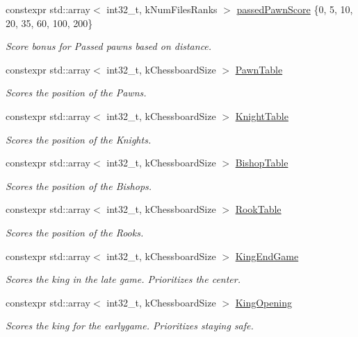 \begin{DoxyCompactItemize}
\mbox{\label{namespaceValue_aa30303e1cad8afe4b7ef7cf689ab2352}} 
constexpr std\+::array$<$ int32\+\_\+t, k\+Num\+Files\+Ranks $>$ \mbox{\hyperlink{namespaceValue_aa30303e1cad8afe4b7ef7cf689ab2352}{passed\+Pawn\+Score}} \{0, 5, 10, 20, 35, 60, 100, 200\}
\begin{DoxyCompactList}\small\item\em Score bonus for Passed pawns based on distance. \end{DoxyCompactList}\item 
constexpr std\+::array$<$ int32\+\_\+t, k\+Chessboard\+Size $>$ \mbox{\hyperlink{namespaceValue_a8b6c72010096d1ae9eb653c5be418db0}{Pawn\+Table}}
\begin{DoxyCompactList}\small\item\em Scores the position of the Pawns. \end{DoxyCompactList}\item 
constexpr std\+::array$<$ int32\+\_\+t, k\+Chessboard\+Size $>$ \mbox{\hyperlink{namespaceValue_a4b65a409f1e288260d4e71d6c13376b5}{Knight\+Table}}
\begin{DoxyCompactList}\small\item\em Scores the position of the Knights. \end{DoxyCompactList}\item 
constexpr std\+::array$<$ int32\+\_\+t, k\+Chessboard\+Size $>$ \mbox{\hyperlink{namespaceValue_ab06336272528cf2e9e3772123f5eb5bb}{Bishop\+Table}}
\begin{DoxyCompactList}\small\item\em Scores the position of the Bishops. \end{DoxyCompactList}\item 
constexpr std\+::array$<$ int32\+\_\+t, k\+Chessboard\+Size $>$ \mbox{\hyperlink{namespaceValue_ae8066836a21ce4367ff232f08ce796a8}{Rook\+Table}}
\begin{DoxyCompactList}\small\item\em Scores the position of the Rooks. \end{DoxyCompactList}\item 
constexpr std\+::array$<$ int32\+\_\+t, k\+Chessboard\+Size $>$ \mbox{\hyperlink{namespaceValue_a581231b1446aff281ae15f755b875341}{King\+End\+Game}}
\begin{DoxyCompactList}\small\item\em Scores the king in the late game. Prioritizes the center. \end{DoxyCompactList}\item 
constexpr std\+::array$<$ int32\+\_\+t, k\+Chessboard\+Size $>$ \mbox{\hyperlink{namespaceValue_a0b4d4bb236eb7c18c48df42e6e3ca1fd}{King\+Opening}}
\begin{DoxyCompactList}\small\item\em Scores the king for the earlygame. Prioritizes staying safe. \end{DoxyCompactList}\end{DoxyCompactItemize}


